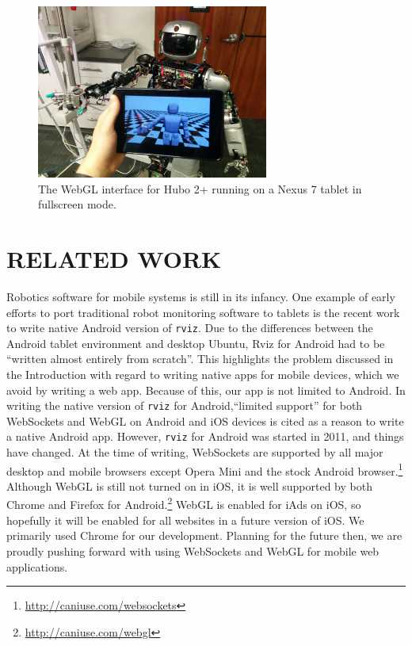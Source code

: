 \documentclass[letterpaper, 10 pt, conference]{ieee/ieeeconf}  %
\begin{document}
\begin{figure}[thpb]
  \centering
  \includegraphics[width=3in]{figures/hubo.jpg}
  \caption{The WebGL interface for Hubo 2+ running on a Nexus 7 tablet in fullscreen mode.}
  \label{fig:Hubo2}
\end{figure}





\section{RELATED WORK}
Robotics software for mobile systems is still in its infancy.
One example of early efforts to port traditional robot monitoring software to tablets is the recent work to write native Android version of \texttt{rviz}.
Due to the differences between the Android tablet environment and desktop Ubuntu, Rviz for Android had to be ``written almost entirely from scratch''. \cite{rviz_android}
This highlights the problem discussed in the Introduction with regard to writing native apps for mobile devices, which we avoid by writing a web app.
Because of this, our app is not limited to Android.
In writing the native version of \texttt{rviz} for Android,``limited support'' for both WebSockets and WebGL on Android and iOS devices is cited as a reason to write a native Android app.
However, \texttt{rviz} for Android was started in 2011, and things have changed.
At the time of writing, WebSockets are supported by all major desktop and mobile browsers except Opera Mini and the stock Android browser.\footnote{\url{http://caniuse.com/websockets}}
Although WebGL is still not turned on in iOS, it is well supported by both Chrome and Firefox for Android.\footnote{\url{http://caniuse.com/webgl}}
WebGL is enabled for iAds on iOS, so hopefully it will be enabled for all websites in a future version of iOS. \cite{iAd}
We primarily used Chrome for our development.
Planning for the future then, we are proudly pushing forward with using WebSockets and WebGL for mobile web applications.
\end{document}
